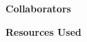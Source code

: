 \documentclass[12pt,letterpaper]{article}
\begin{document}
\textbf{Collaborators}

\textbf{Resources Used}

\noindent\makebox[\linewidth]{\rule{\linewidth}{0.4pt}}

\cite{Goodfellow-et-al-2016}

\newpage


\end{document}
